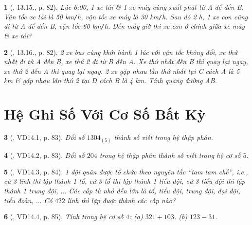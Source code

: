 \documentclass{article}
\newtheorem{baitoan}{}
\begin{document}
\begin{baitoan}[\cite{TLCT_THCS_Toan_6_so_hoc}, 13.15., p. 82]
	Lúc {\rm6:00}, 1 xe tải \& 1 xe máy cùng xuất phát từ A để đến B. Vận tốc xe tải là {\rm50 km{\tt/}h}, vận tốc xe máy là {\rm30 km{\tt/}h}. Sau đó {\rm2 h}, 1 xe con cũng đi từ A để đến B, vận tốc {\rm60 km{\tt/}h}. Đến mấy giờ thì xe con ở chính giữa xe máy \& xe tải?
\end{baitoan}

\begin{baitoan}[\cite{TLCT_THCS_Toan_6_so_hoc}, 13.16., p. 82]
	2 xe bus cùng khởi hành 1 lúc với vận tốc không đổi, xe thứ nhất đi từ A đến B, xe thứ 2 đi từ B đến A. Xe thứ nhất đến B thì quay lại ngay, xe thứ 2 đến A thì quay lại ngay. 2 xe gặp nhau lần thứ nhất tại C cách A là {\rm5 km} \& gặp nhau lần thứ 2 tại D cách B là {\rm4 km}. Tính quãng đường AB.
\end{baitoan}


\section{Hệ Ghi Số Với Cơ Số Bất Kỳ}

\begin{baitoan}[\cite{TLCT_THCS_Toan_6_so_hoc}, VD14.1, p. 83]
	Đổi số $1304_{(5)}$ thành số viết trong hệ thập phân.
\end{baitoan}

\begin{baitoan}[\cite{TLCT_THCS_Toan_6_so_hoc}, VD14.2, p. 83]
	Đổi số $204$ trong hệ thập phân thành số viết trong hệ cơ số $5$.
\end{baitoan}

\begin{baitoan}[\cite{TLCT_THCS_Toan_6_so_hoc}, VD14.3, p. 84]
	1 đội quân được tổ chức theo nguyên tắc ``tam tam chế'', i.e., cứ 3 lính thì lập thành 1 tổ, cứ 3 tổ thì lập thành 1 tiểu đội, cứ 3 tiểu đội thì lập thành 1 trung đội, $\ldots$ Các cấp từ nhỏ đến lớn là tổ, tiểu đội, trung đội, đại đội, tiểu đoàn, $\ldots$ Có $422$ lính thì lập được thành các cấp nào?
\end{baitoan}

\begin{baitoan}[\cite{TLCT_THCS_Toan_6_so_hoc}, VD14.4, p. 85]
	Tính trong hệ cơ số $4$: (a) $321 + 103$. (b) $123 - 31$.
\end{baitoan}
\end{document}
